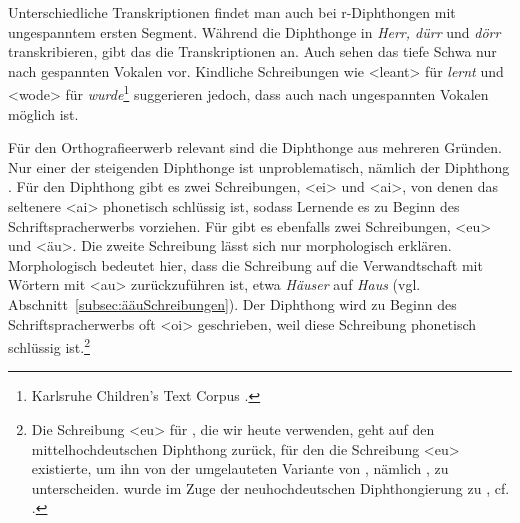 Unterschiedliche Transkriptionen findet man auch bei r-Diphthongen mit ungespanntem ersten Segment. Während \citet[28]{FuhrhopPeters2013} die Diphthonge in \textit{Herr, dürr} und \textit{dörr} \textipa{[E5, Y5, \oe 5]} transkribieren,  gibt das \citet{DudenAussprache2023} die Transkriptionen  an. Auch \citet[33--34]{Ruesetal2014} sehen das tiefe Schwa nur nach gespannten Vokalen vor. Kindliche Schreibungen wie <leant> für \textit{lernt} und <wode> für \textit{wurde}\footnote{Karlsruhe Children's Text Corpus \citep{Lavalleyetal2015}.} suggerieren jedoch, dass auch nach ungespannten Vokalen \textipa{[5]} möglich ist.

Für den Orthografieerwerb relevant sind die Diphthonge aus mehreren Gründen. Nur einer der steigenden Diphthonge ist unproblematisch, nämlich der Diph\-thong \textipa{[\t*{aU}]}. Für den Diphthong \textipa{[\t*{aI}]} gibt es zwei Schreibungen, <ei> und <ai>, von denen das seltenere <ai> phonetisch schlüssig ist, sodass Lernende es zu Beginn des Schriftspracherwerbs vorziehen. Für \textipa{[\t*{OI}]} gibt es ebenfalls zwei Schreibungen, <eu> und <äu>. Die zweite Schreibung lässt sich nur morphologisch erklären. Morphologisch bedeutet hier, dass die Schreibung auf die Verwandtschaft mit Wörtern mit <au> zurückzuführen ist, etwa \textit{Häuser} auf \textit{Haus} (vgl. Abschnitt~\ref{subsec:ääuSchreibungen}). Der Diphthong \textipa{[\t*{OI}]} wird zu Beginn des Schriftspracherwerbs oft <oi> geschrieben, weil diese Schreibung phonetisch schlüssig ist.\footnote{Die Schreibung <eu> für \textipa{[OI]}, die wir heute verwenden, geht auf den mittelhochdeutschen Diphthong \textipa{[iu]} zurück, für den die Schreibung <eu> existierte, um ihn von der umgelauteten Variante von \textipa{[iu]}, nämlich \textipa{[y:]}, zu unterscheiden. \textipa{[iu]} wurde im Zuge der neuhochdeutschen Diphthongierung zu \textipa{[OI]}, cf. \citet[74, 100]{Paul2007}.}

